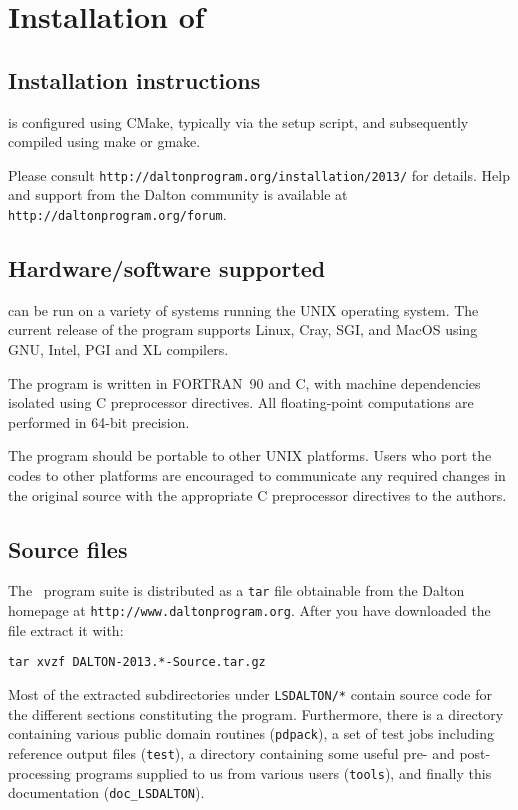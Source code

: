 \chapter{Installation of \lsdalton}\label{ch:install}

\section{Installation instructions}

{\lsdalton} is configured using CMake, typically via the setup script,
and subsequently compiled using make or gmake.

Please consult \verb|http://daltonprogram.org/installation/2013/| for details.
Help and support from the Dalton community is available at \verb|http://daltonprogram.org/forum|.

\section{Hardware/software supported}
{\lsdalton} can be run on a variety of systems running the UNIX operating system.
The current release of the program supports Linux, Cray, SGI,
and MacOS using GNU, Intel, PGI and XL compilers.

The program is written in FORTRAN~90 and C, with machine dependencies
isolated using C preprocessor directives.  All
floating-point computations are performed in 64-bit precision.

The program should be portable to other UNIX platforms.  Users
who port the codes to other platforms are encouraged to communicate any
required changes in the original source with the appropriate C preprocessor
directives to the authors.

\section{Source files}\label{sec:source}

The \latestrelease\ program suite is distributed as a \verb|tar|
file obtainable from
the Dalton homepage at \verb|http://www.daltonprogram.org|.
After you have downloaded the file extract it with:
\begin{verbatim}
tar xvzf DALTON-2013.*-Source.tar.gz
\end{verbatim}
Most of the extracted subdirectories under \verb|LSDALTON/*| contain source code for the different
sections constituting the {\lsdalton} program.
Furthermore, there is a directory containing various public domain routines (\verb|pdpack|), a set of test jobs including reference output files (\verb|test|), a directory
containing some useful pre- and post-processing programs supplied to us from
various users (\verb|tools|), and finally this documentation (\verb|doc_LSDALTON|). 

